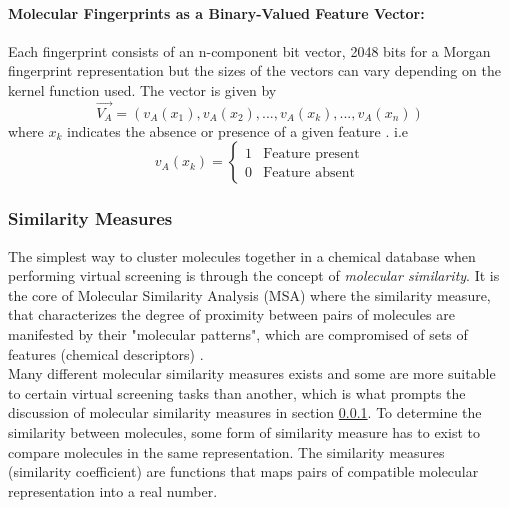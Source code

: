 \documentclass[a4paper,12pt]{report}
\begin{document}
				\paragraph{Molecular Fingerprints as a Binary-Valued Feature Vector:}
				Each fingerprint consists of an n-component bit vector, 2048 bits for a Morgan fingerprint representation but the sizes of the vectors can vary depending on the kernel function used. The vector is given by 
					\begin{equation}
						\vec{V_A} = (v_A(x_1), v_A(x_2),...,v_A(x_k),...,v_A(x_n))
					\end{equation}
				where $x_k$ indicates the absence or presence of a given feature \cite{Jurgen2004}. i.e
					\begin{equation}
						v_A(x_k) = 
						\begin{cases}
							1 & \text{Feature present} \\
							0 & \text{Feature absent}
						\end{cases}
					\end{equation}
			\subsubsection{Similarity Measures} 
			\label{subsubsection_similarity_measures}
			The simplest way to cluster molecules together in a chemical database when performing virtual screening is through the concept of \textit{molecular similarity}. It is the core of Molecular Similarity Analysis (MSA) where the similarity measure, that characterizes the degree of proximity between pairs of molecules are manifested by their "molecular patterns", which are compromised of sets of features (chemical descriptors) \cite{Jurgen2004}. \\
			Many different molecular similarity measures exists and some are more suitable to certain virtual screening tasks than another, which is what prompts the discussion of molecular similarity measures in section \ref{subsubsection_similarity_measures}. 
			To determine the similarity between molecules, some form of similarity measure has to exist to compare molecules in the same representation. The similarity measures (similarity coefficient) are functions that maps pairs of compatible molecular representation into a real number. 
			
\end{document}
